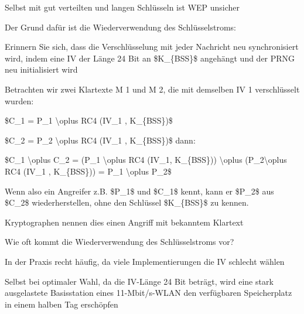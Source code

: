 \documentclass[a4paper]{article}
\begin{document}
\begin{multicols}{3}
      \begin{itemize*}
            \item Selbst mit gut verteilten und langen Schlüsseln ist WEP unsicher
            \item Der Grund dafür ist die Wiederverwendung des Schlüsselstroms:
            \begin{itemize*}
                  \item Erinnern Sie sich, dass die Verschlüsselung mit jeder Nachricht neu synchronisiert wird, indem eine IV der Länge 24 Bit an \$K\_\{BSS\}\$ angehängt und der PRNG neu initialisiert wird
                  \item Betrachten wir zwei Klartexte M 1 und M 2, die mit demselben IV 1 verschlüsselt wurden:
                  \begin{itemize*} \item \$C\_1 = P\_1 \textbackslash oplus RC4 (IV\_1 , K\_\{BSS\})\$ \item \$C\_2 = P\_2 \textbackslash oplus RC4 (IV\_1 , K\_\{BSS\})\$ dann: \item \$C\_1 \textbackslash oplus C\_2 = (P\_1 \textbackslash oplus RC4 (IV\_1, K\_\{BSS\})) \textbackslash oplus (P\_2\textbackslash oplus RC4 (IV\_1 , K\_\{BSS\})) = P\_1 \textbackslash oplus P\_2\$ \end{itemize*}
                  \item Wenn also ein Angreifer z.B. \$P\_1\$ und \$C\_1\$ kennt, kann er \$P\_2\$ aus \$C\_2\$ wiederherstellen, ohne den Schlüssel \$K\_\{BSS\}\$ zu kennen.
                  \begin{itemize*} \item Kryptographen nennen dies einen Angriff mit bekanntem Klartext \end{itemize*}
            \end{itemize*}
            \item Wie oft kommt die Wiederverwendung des Schlüsselstroms vor?
            \begin{itemize*}
                  \item In der Praxis recht häufig, da viele Implementierungen die IV schlecht wählen
                  \item Selbst bei optimaler Wahl, da die IV-Länge 24 Bit beträgt, wird eine stark ausgelastete Basisstation eines 11-Mbit/s-WLAN den verfügbaren Speicherplatz in einem halben Tag erschöpfen
            \end{itemize*}
      \end{itemize*}



\end{multicols}
\end{document}
